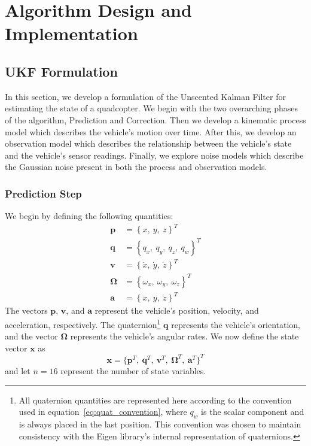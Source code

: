 \chapter{Algorithm Design and Implementation} \label{ch:Alg_Design}

\section{UKF Formulation} \label{sec:ukf_formulation}

In this section, we develop a formulation of the Unscented Kalman Filter for estimating the state of a quadcopter. We begin with the two overarching phases of the algorithm, Prediction and Correction. Then we develop a kinematic process model which describes the vehicle's motion over time. After this, we develop an observation model which describes the relationship between the vehicle's state and the vehicle's sensor readings. Finally, we explore noise models which describe the Gaussian noise present in both the process and observation models.

\subsection{Prediction Step}

We begin by defining the following quantities:
%
\begin{align} \label{eq:state_vars}
\mathbf{p} &= \left\lbrace x,\ y,\ z \right\rbrace ^{T} \\
\mathbf{q} &= \left\lbrace q_{x},\ q_{y},\ q_{z},\ q_{w} \right\rbrace ^{T} \label{eq:quat_convention} \\
\mathbf{v} &= \left\lbrace \dot{x},\ \dot{y},\ \dot{z} \right\rbrace ^{T} \\
\bm{\Omega} &= \left\lbrace \omega_{x},\ \omega_{y},\ \omega_{z} \right\rbrace ^{T} \\
\mathbf{a} &= \left\lbrace \ddot{x},\ \ddot{y},\ \ddot{z} \right\rbrace ^{T}
\end{align}
%
The vectors $\mathbf{p}$, $\mathbf{v}$, and $\mathbf{a}$ represent the vehicle's position, velocity, and acceleration, respectively. The quaternion\footnote{All quaternion quantities are represented here according to the convention used in equation~\ref{eq:quat_convention}, where $q_{w}$ is the scalar component and is always placed in the last position. This convention was chosen to maintain consistency with the Eigen library's internal representation of quaternions.} $\mathbf{q}$ represents the vehicle's orientation, and the vector $\bm{\Omega}$ represents the vehicle's angular rates. We now define the state vector $\mathbf{x}$ as
%
\begin{equation}
\mathbf{x} = 
\Big\{
    \mathbf{p}^{T},\
    \mathbf{q}^{T},\
    \mathbf{v}^{T},\
    \bm{\Omega}^{T},\
    \mathbf{a}^{T}
\Big\} ^{T}
\end{equation}
%
and let $n = 16$ represent the number of state variables.

